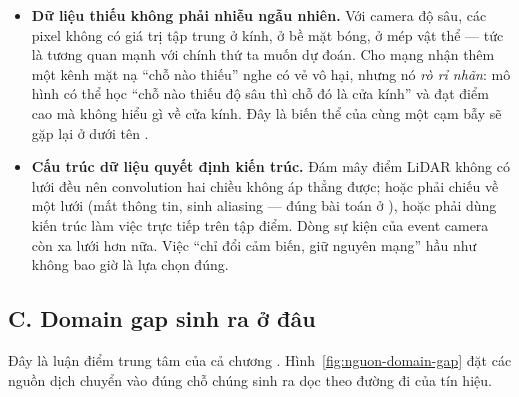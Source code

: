 \documentclass[../../../deep_learning.tex]{subfiles}
\begin{document}
\begin{itemize}
\item \textbf{Dữ liệu thiếu không phải nhiễu ngẫu nhiên.} Với camera độ sâu, các pixel không có giá trị tập trung ở kính, ở bề mặt bóng, ở mép vật thể --- tức là tương quan mạnh với chính thứ ta muốn dự đoán. Cho mạng nhận thêm một kênh mặt nạ ``chỗ nào thiếu'' nghe có vẻ vô hại, nhưng nó \emph{rò rỉ nhãn}: mô hình có thể học ``chỗ nào thiếu độ sâu thì chỗ đó là cửa kính'' và đạt điểm cao mà không hiểu gì về cửa kính. Đây là biến thể của cùng một cạm bẫy sẽ gặp lại ở  dưới tên .

\item \textbf{Cấu trúc dữ liệu quyết định kiến trúc.} Đám mây điểm LiDAR không có lưới đều nên convolution hai chiều không áp thẳng được; hoặc phải chiếu về một lưới (mất thông tin, sinh aliasing --- đúng bài toán ở ), hoặc phải dùng kiến trúc làm việc trực tiếp trên tập điểm. Dòng sự kiện của event camera còn xa lưới hơn nữa. Việc ``chỉ đổi cảm biến, giữ nguyên mạng'' hầu như không bao giờ là lựa chọn đúng.

\end{itemize}

\subsection{C. Domain gap sinh ra ở đâu}
Đây là luận điểm trung tâm của cả chương . Hình~\ref{fig:nguon-domain-gap} đặt các nguồn dịch chuyển vào đúng chỗ chúng sinh ra dọc theo đường đi của tín hiệu.
\end{document}
